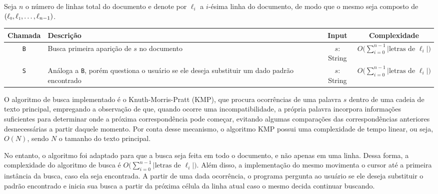 \documentclass[a4paper, 11pt]{article}
\begin{document}
Seja $n$ o número de linhas total do documento e denote por $\ell_i$ a $i$-ésima linha do documento, de modo que o mesmo seja composto de $(\sub\ell 0, \sub \ell 1, \ldots, \ell_{n-1})$.
\begin{table}[H]
\centering
\begin{tabularx}{\linewidth}{|c|X|c|c|}
\hline
\textbf{Chamada} & \textbf{Descrição} & \textbf{Input} & \textbf{Complexidade}
\\ 
\hline
\texttt{B} & Busca primeira aparição de $s$ no documento & $s$: String & $O\Big(\sum\limits_{i=0}^{n-1} |\text{letras de }\ell_i|\Big)$ \\
\texttt{S} & Análoga a \texttt B, porém questiona o usuário se ele deseja substituir um dado padrão encontrado & $s$: String & $O\Big(\sum\limits_{i=0}^{n-1} |\text{letras de }\ell_i|\Big)$ \\
\hline
\end{tabularx}
\end{table}

O algoritmo de busca implementado é o Knuth-Morris-Pratt (KMP), que procura ocorrências de uma palavra $s$ dentro de uma cadeia de texto principal, empregando a observação de que, quando ocorre uma incompatibilidade, a própria palavra incorpora informações suficientes para determinar onde a próxima correspondência pode começar, evitando algumas comparações das correspondências anteriores desnecessárias a partir daquele momento. Por conta desse mecanismo, o algoritmo KMP possui uma complexidade de tempo linear, ou seja, $O(N)$, sendo $N$ o tamanho do texto principal. 

No entanto, o algoritmo foi adaptado para que a busca seja feita em todo o documento, e não apenas em uma linha. Dessa forma, a complexidade do algoritmo de busca é $O\Big(\sum\limits_{i=0}^{n-1} |\text{letras de }\ell_i|\Big)$. Além disso, a implementação do mesmo movimenta o cursor até a primeira instância da busca, caso ela seja encontrada. A partir de uma dada ocorrência, o programa pergunta ao usuário se ele deseja substituir o padrão encontrado e inicia sua busca a partir da próxima célula da linha atual caso o mesmo decida continuar buscando.
\end{document}

